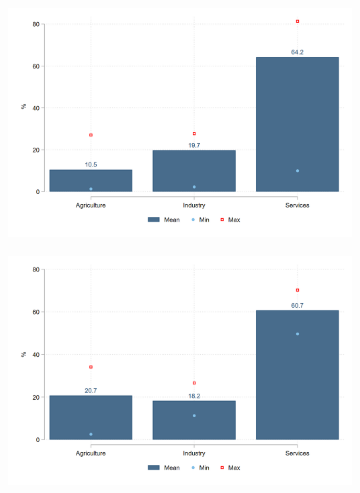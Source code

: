 \documentclass[english]{article}
\begin{document}
\begin{itemize}
\begin{figure}[htb!]
\begin{subfigure}{.5\textwidth}
  \centering
  \includegraphics[width=1\textwidth]{latex/figures/Snapshot/Salaried-sector.png}
  \label{fig:salariedsector}
\end{subfigure}%
\begin{subfigure}{.5\textwidth}
  \centering
\includegraphics[width=1\textwidth]{latex/figures/Snapshot/Self employed-sector.png}
  \label{fig:selfsector}
\end{subfigure}


\end{figure}
\end{itemize}
\end{document}
